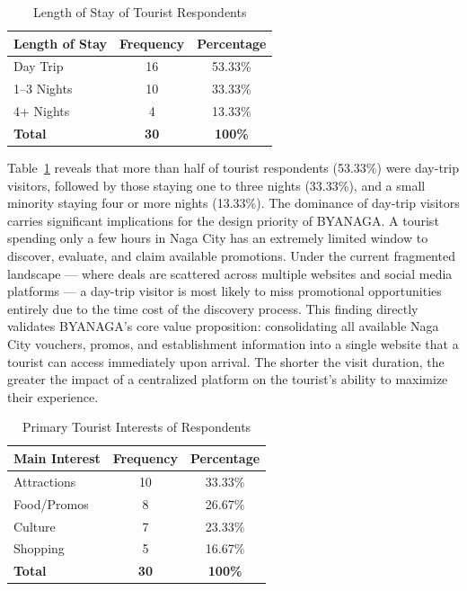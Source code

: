 \documentclass{research}
\begin{document}
\begin{table}[h]
    \centering
    \begin{tabular}{|l|c|c|}
        \hline
        \textbf{Length of Stay} & \textbf{Frequency} & \textbf{Percentage} \\
        \hline
        Day Trip    & 16 & 53.33\% \\
        1--3 Nights & 10 & 33.33\% \\
        4+ Nights   & 4  & 13.33\% \\
        \hline
        \textbf{Total} & \textbf{30} & \textbf{100\%} \\
        \hline
    \end{tabular}
    \caption{Length of Stay of Tourist Respondents}
    \label{tab:length_stay}
\end{table}

Table~\ref{tab:length_stay} reveals that more than half of tourist respondents 
(53.33\%) were day-trip visitors, followed by those staying one to three nights 
(33.33\%), and a small minority staying four or more nights (13.33\%). The 
dominance of day-trip visitors carries significant implications for the design 
priority of BYANAGA. A tourist spending only a few hours in Naga City has an 
extremely limited window to discover, evaluate, and claim available promotions. 
Under the current fragmented landscape --- where deals are scattered across 
multiple websites and social media platforms --- a day-trip visitor is most likely 
to miss promotional opportunities entirely due to the time cost of the discovery 
process. This finding directly validates BYANAGA's core value proposition: 
consolidating all available Naga City vouchers, promos, and establishment 
information into a single website that a tourist can access immediately upon 
arrival. The shorter the visit duration, the greater the impact of a centralized 
platform on the tourist's ability to maximize their experience.

\begin{table}[h]
    \centering
    \begin{tabular}{|l|c|c|}
        \hline
        \textbf{Main Interest} & \textbf{Frequency} & \textbf{Percentage} \\
        \hline
        Attractions  & 10 & 33.33\% \\
        Food/Promos  & 8  & 26.67\% \\
        Culture      & 7  & 23.33\% \\
        Shopping     & 5  & 16.67\% \\
        \hline
        \textbf{Total} & \textbf{30} & \textbf{100\%} \\
        \hline
    \end{tabular}
    \caption{Primary Tourist Interests of Respondents}
    \label{tab:tourist_interests}
\end{table}
\end{document}

